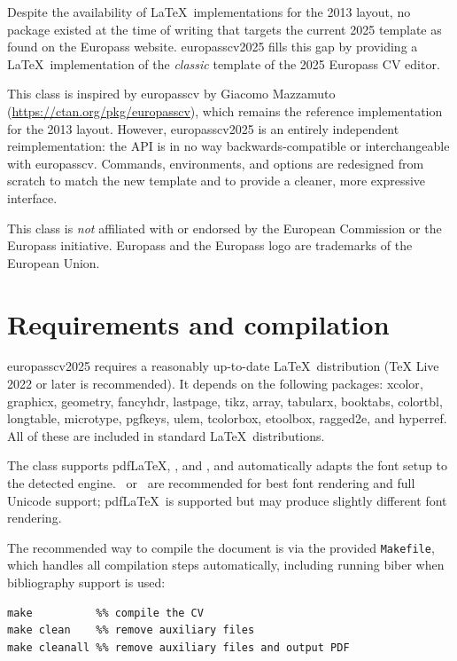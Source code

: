 \documentclass[a4paper, 12pt]{article}
\newcommand{\pkg}[1]{\textsf{#1}}
\begin{document}
Despite the availability of \LaTeX\ implementations for the 2013 layout,
no package existed at the time of writing that targets the current 2025
template as found on the Europass website. \pkg{europasscv2025} fills
this gap by providing a \LaTeX\ implementation of the \emph{classic}
template of the 2025 Europass CV editor.

This class is inspired by \pkg{europasscv} by Giacomo Mazzamuto
(\url{https://ctan.org/pkg/europasscv}), which remains the reference
implementation for the 2013 layout. However, \pkg{europasscv2025} is an
entirely independent reimplementation: the API is in no way
backwards-compatible or interchangeable with \pkg{europasscv}. Commands,
environments, and options are redesigned from scratch to match the new
template and to provide a cleaner, more expressive interface.

This class is \emph{not} affiliated with or endorsed by the European
Commission or the Europass initiative. Europass and the Europass logo are
trademarks of the European Union.

\section{Requirements and compilation}

\pkg{europasscv2025} requires a reasonably up-to-date \LaTeX\ distribution
(TeX Live 2022 or later is recommended). It depends on the following
packages: \pkg{xcolor}, \pkg{graphicx}, \pkg{geometry}, \pkg{fancyhdr},
\pkg{lastpage}, \pkg{tikz}, \pkg{array}, \pkg{tabularx}, \pkg{booktabs},
\pkg{colortbl}, \pkg{longtable}, \pkg{microtype}, \pkg{pgfkeys},
\pkg{ulem}, \pkg{tcolorbox}, \pkg{etoolbox}, \pkg{ragged2e}, and
\pkg{hyperref}. All of these are included in standard \LaTeX\ distributions.

The class supports pdf\LaTeX, \XeLaTeX, and \LuaLaTeX, and automatically
adapts the font setup to the detected engine. \XeLaTeX\ or \LuaLaTeX\ are
recommended for best font rendering and full Unicode support; pdf\LaTeX\
is supported but may produce slightly different font rendering.

The recommended way to compile the document is via the provided
\texttt{Makefile}, which handles all compilation steps automatically,
including running \pkg{biber} when bibliography support is used:

\begin{verbatim}
make          %% compile the CV
make clean    %% remove auxiliary files
make cleanall %% remove auxiliary files and output PDF
\end{verbatim}
\end{document}
